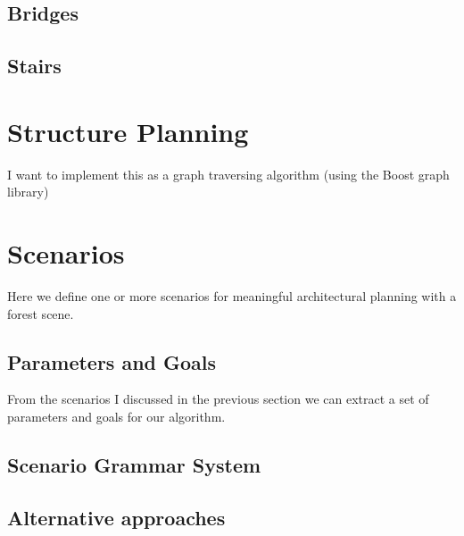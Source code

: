 \subsection{Bridges}
\label{sec:bridges}
 

\subsection{Stairs}
\label{sec:stairs}
  
 

\section{Structure Planning}
\label{sec:PlanningAlgorithm} 
 
 
 
 
 
 I want to implement this as a graph traversing algorithm
 (using the Boost graph library)
 
 
\section{Scenarios}


Here we define one or more scenarios for meaningful architectural planning with a forest scene. 


\subsection{Parameters and Goals}

From the scenarios I discussed in the previous section we can extract a set of parameters and goals for our algorithm.

\subsection{Scenario Grammar System}
  
 

 


 \subsection{Alternative approaches}
 